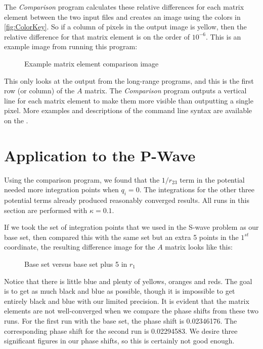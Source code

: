 \documentclass[Dissertation.tex]{subfiles}
\begin{document}
The \emph{Comparison} program calculates these relative differences for each matrix element between the two input files and creates an image using the colors in \cref{fig:ColorKey}. So if a column of pixels in the output image is yellow, then the relative difference for that matrix element is on the order of $10^{-6}$. This is an example image from running this program:
\begin{figure}
	\centering
	\caption{Example matrix element comparison image}
	\label{fig:QuadExample}
\end{figure}
This only looks at the output from the long-range programs, and this is the first row (or column) of the $A$ matrix. The \emph{Comparison} program outputs a vertical line for each matrix element to make them more visible than outputting a single pixel. More examples and descriptions of the command line syntax are available on the  \cite{Wiki}.

\section{Application to the P-Wave}

Using the comparison program, we found that the $1/r_{23}$ term in the potential needed more integration points when $q_i = 0$. The integrations for the other three potential terms already produced reasonably converged results. All runs in this section are performed with $\kappa = 0.1$.

If we took the set of integration points that we used in the S-wave problem as our base set, then compared this with the same set but an extra 5 points in the $1^{st}$ coordinate, the resulting difference image for the $A$ matrix looks like this:
\begin{figure}
	\centering
	\caption{Base set versus base set plus 5 in $r_1$}
	\label{fig:BasevsBaseplus5}
\end{figure}
\noindent Notice that there is little blue and plenty of yellows, oranges and reds. The goal is to get as much black and blue as possible, though it is impossible to get entirely black and blue with our limited precision. It is evident that the matrix elements are not well-converged when we compare the phase shifts from these two runs. For the first run with the base set, the phase shift is 0.02346176. The corresponding phase shift for the second run is 0.02294583. We desire three significant figures in our phase shifts, so this is certainly not good enough.
\end{document}
